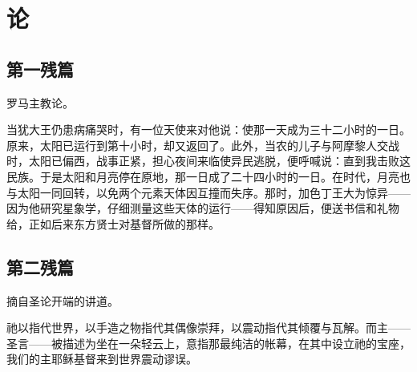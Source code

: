 
\section{论 }


\subsection{第一残篇}

罗马主教论。\par

当犹大王仍患病痛哭时，有一位天使来对他说：使那一天成为三十二小时的一日。原来，太阳已运行到第十小时，却又返回了。此外，当农的儿子与阿摩黎人交战时，太阳已偏西，战事正紧，担心夜间来临使异民逃脱，便呼喊说：直到我击败这民族。于是太阳和月亮停在原地，那一日成了二十四小时的一日。在时代，月亮也与太阳一同回转，以免两个元素天体因互撞而失序。那时，加色丁王大为惊异——因为他研究星象学，仔细测量这些天体的运行——得知原因后，便送书信和礼物给，正如后来东方贤士对基督所做的那样。\par


\subsection{第二残篇}

摘自圣论开端的讲道。\par

祂以指代世界，以手造之物指代其偶像崇拜，以震动指代其倾覆与瓦解。而主——圣言——被描述为坐在一朵轻云上，意指那最纯洁的帐幕，在其中设立祂的宝座，我们的主耶稣基督来到世界震动谬误。\par


